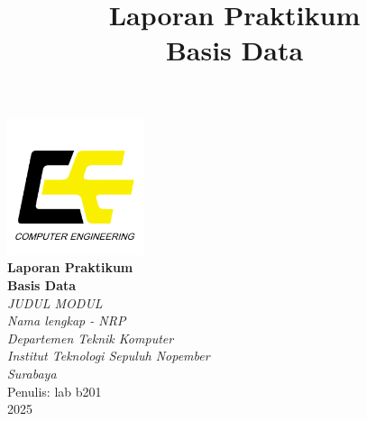 \documentclass[a4paper,12pt]{report}
\title{Laporan Praktikum\\
Basis Data}
\author{}
\date{}
\begin{document}
\begin{titlepage}
    \centering

    \includegraphics[width=0.3\textwidth]{images/logo-tekkom.png}\\[1cm]

    {\Huge \textbf{Laporan Praktikum}\\[0.3cm]}
    {\Huge \textbf{Basis Data}}\\[1cm]
    
    {\Large \textit{JUDUL MODUL}}\\[0.3cm]
    {\Large \textit{Nama lengkap - NRP}}\\[3cm]
    
    {\large \textit{Departemen Teknik Komputer}}\\
    {\large \textit{Institut Teknologi Sepuluh Nopember}}\\
    {\large \textit{Surabaya}}\\[3cm]

    \hfill Penulis: lab b201\\
    \hfill 2025
\end{titlepage}

\tableofcontents
\clearpage











\end{document}
